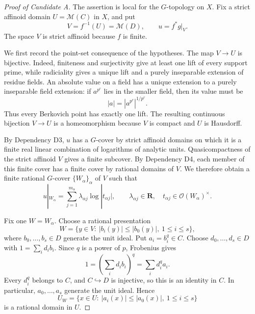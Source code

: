 
\begin{proof}[Proof of Candidate A]
The assertion is local for the \(G\)-topology on \(X\).  Fix a strict
affinoid domain \(U=\mathcal M(C)\) in \(X\), and put
\[
                V=f^{-1}(U)=\mathcal M(D),\qquad u=f^*g|_V.
\]
The space \(V\) is strict affinoid because \(f\) is finite.

We first record the point-set consequence of the hypotheses.  The map
\(V\to U\) is bijective.  Indeed, finiteness and surjectivity give at least
one lift of every support prime, while radiciality gives a unique lift and a
purely inseparable extension of residue fields.  An absolute value on a
field has a unique extension to a purely inseparable field extension: if
\(a^{p^r}\) lies in the smaller field, then its value must be
\[
                       |a|=|a^{p^r}|^{1/p^r}.
\]
Thus every Berkovich point has exactly one lift.  The resulting continuous
bijection \(V\to U\) is a homeomorphism because \(V\) is compact and \(U\)
is Hausdorff.

By Dependency D3, \(u\) has a \(G\)-cover by strict affinoid domains on
which it is a finite real linear combination of logarithms of analytic
units.  Quasicompactness of the strict affinoid \(V\) gives a finite
subcover.  By Dependency D4, each member of this finite cover has a finite
cover by rational domains of \(V\).  We therefore obtain a finite rational
\(G\)-cover \(\{W_\alpha\}_\alpha\) of \(V\) such that
\begin{equation}
 \label{eq:candidate-a-upstairs-rpl}
       u|_{W_\alpha}
       =\sum_{j=1}^{m_\alpha}\lambda_{\alpha j}
                      \log|t_{\alpha j}|,
 \qquad
       \lambda_{\alpha j}\in\mathbf R,\quad
       t_{\alpha j}\in\mathcal O(W_\alpha)^\times .
\end{equation}

Fix one \(W=W_\alpha\).  Choose a rational presentation
\[
 W=\bigl\{y\in V:\ |b_i(y)|\leq |b_0(y)|,
                  \ 1\leq i\leq s\bigr\},
\]
where \(b_0,\ldots,b_s\in D\) generate the unit ideal.  Put
\(a_i=b_i^q\in C\).  Choose \(d_0,\ldots,d_s\in D\) with
\(1=\sum_i d_i b_i\).  Since \(q\) is a power of \(p\), Frobenius gives
\[
             1=\left(\sum_i d_i b_i\right)^q
              =\sum_i d_i^q a_i.
\]
Every \(d_i^q\) belongs to \(C\), and \(C\hookrightarrow D\) is injective,
so this is an identity in \(C\).  In particular,
\(a_0,\ldots,a_s\) generate the unit ideal.  Hence
\[
 U_W=\bigl\{x\in U:\ |a_i(x)|\leq |a_0(x)|,
                  \ 1\leq i\leq s\bigr\}
\]
is a rational domain in \(U\).


\end{proof}
